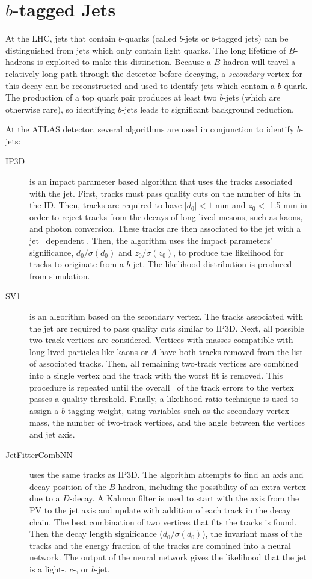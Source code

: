 \section{$b$-tagged Jets}
At the LHC, jets that contain $b$-quarks (called $b$-jets or $b$-tagged jets) can be distinguished from jets which only contain light quarks\cite{btagcom,btagptrel}. The long lifetime of $B$-hadrons is exploited to make this distinction. Because a $B$-hadron will travel a relatively long path through the detector before decaying, a \emph{secondary} vertex for this decay can be reconstructed and used to identify jets which contain a $b$-quark. The production of a top quark pair produces at least two $b$-jets (which are otherwise rare), so identifying $b$-jets leads to significant background reduction. 

At the ATLAS detector, several algorithms are used in conjunction to identify $b$-jets:
\begin{description}
\item[IP3D] is an impact parameter based algorithm that uses the tracks associated with the jet. First, tracks must pass quality cuts on the number of hits in the ID. Then, tracks are required to have $|d_0|< 1$ mm and $z_0<$ 1.5 mm in order to reject tracks from the decays of long-lived mesons, such as kaons, and photon conversion. These tracks are then associated to the jet with a jet \pt\ dependent \dR. Then, the algorithm uses the impact parameters' significance, $d_0/\sigma(d_0)$ and $z_0/\sigma(z_0)$, to produce the likelihood for tracks to originate from a $b$-jet. The likelihood distribution is produced from simulation.
\item[SV1] is an algorithm based on the secondary vertex. The tracks associated with the jet are required to pass quality cuts similar to IP3D. Next, all possible two-track vertices are considered. Vertices with masses compatible with long-lived particles like kaons or $\Lambda$ have both tracks removed from the list of associated tracks. Then, all remaining two-track vertices are combined into a single vertex and the track with the worst fit is removed. This procedure is repeated until the overall \chisq\ of the track errors to the vertex passes a quality threshold. Finally, a likelihood ratio technique is used to assign a $b$-tagging weight, using variables such as the secondary vertex mass, the number of two-track vertices, and the angle between the vertices and jet axis.

\item[JetFitterCombNN] uses the same tracks as IP3D. The algorithm attempts to find an axis and decay position of the $B$-hadron, including the possibility of an extra vertex due to a $D$-decay. A Kalman filter is used to start with the axis from the PV to the jet axis and update with addition of each track in the decay chain. The best combination of two vertices that fits the tracks is found. Then the decay length significance ($d_0/\sigma(d_0)$), the invariant mass of the tracks and the energy fraction of the tracks are combined into a neural network. The output of the neural network gives the likelihood that the jet is a light-, $c$-, or $b$-jet.
\end{description}




